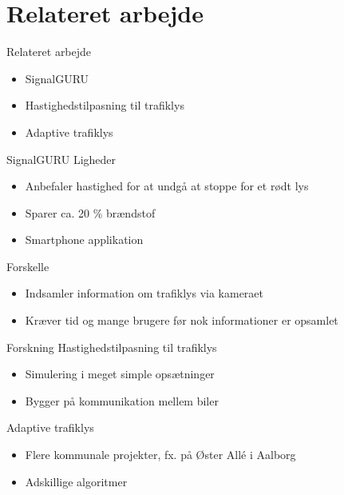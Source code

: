 \section{Relateret arbejde}
\begin{frame}{Relateret arbejde}
\begin{itemize}
\item SignalGURU
\item Hastighedstilpasning til trafiklys
\item Adaptive trafiklys
\end{itemize}
\end{frame}

\begin{frame}{SignalGURU}
Ligheder
\begin{itemize}
	\item Anbefaler hastighed for at undgå at stoppe for et rødt lys
	\item Sparer ca. 20 \% brændstof
	\item Smartphone applikation
\end{itemize}
\vspace{5mm}
Forskelle
\begin{itemize}
	\item Indsamler information om trafiklys via kameraet
	\item Kræver tid og mange brugere før nok informationer er opsamlet
\end{itemize}
\vspace{5mm}
\end{frame}

\begin{frame}{Forskning}
Hastighedstilpasning til trafiklys
\begin{itemize}
	\item Simulering i meget simple opsætninger
	\item Bygger på kommunikation mellem biler
\end{itemize}

\vspace{5mm}
Adaptive trafiklys
\begin{itemize}
	\item Flere kommunale projekter, fx. på Øster Allé i Aalborg
	\item Adskillige algoritmer
\end{itemize}
\end{frame}